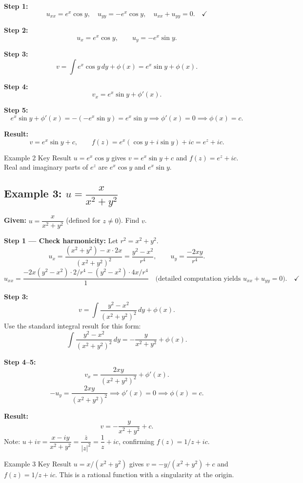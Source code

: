 \documentclass[12pt,a4paper]{article}
\begin{document}
\medskip
\textbf{Step 1:}
\[
  u_{xx}=e^x\cos y,\quad u_{yy}=-e^x\cos y,\quad u_{xx}+u_{yy}=0.\quad\checkmark
\]

\textbf{Step 2:}
\[
  u_x = e^x\cos y,\qquad u_y = -e^x\sin y.
\]

\textbf{Step 3:}
\[
  v = \int e^x\cos y\,dy + \phi(x) = e^x\sin y + \phi(x).
\]

\textbf{Step 4:}
\[
  v_x = e^x\sin y + \phi'(x).
\]

\textbf{Step 5:}
\[
  e^x\sin y+\phi'(x)= -(-e^x\sin y)=e^x\sin y \implies \phi'(x)=0 \implies \phi(x)=c.
\]

\textbf{Result:}
\[
  \boxed{v=e^x\sin y+c,\qquad f(z)=e^x(\cos y+i\sin y)+ic=e^z+ic.}
\]

\begin{learnbox}{Example 2 Key Result}
$u=e^x\cos y$ gives $v=e^x\sin y+c$ and $f(z)=e^z+ic$. Real and imaginary parts of
$e^z$ are $e^x\cos y$ and $e^x\sin y$.
\end{learnbox}

\subsection*{Example 3: $u = \dfrac{x}{x^2+y^2}$}

\textbf{Given:} $u=\dfrac{x}{x^2+y^2}$ (defined for $z\neq0$). Find $v$.

\medskip
\textbf{Step 1 --- Check harmonicity:} Let $r^2=x^2+y^2$.
\[
  u_x = \frac{(x^2+y^2)-x\cdot 2x}{(x^2+y^2)^2}=\frac{y^2-x^2}{r^4},\qquad
  u_y = \frac{-2xy}{r^4}.
\]
\[
  u_{xx}=\frac{-2x(y^2-x^2)\cdot2/r^4 - (y^2-x^2)\cdot 4x/r^4}{1}
  \quad\text{(detailed computation yields }u_{xx}+u_{yy}=0\text{).}\quad\checkmark
\]

\textbf{Step 3:}
\[
  v = \int \frac{y^2-x^2}{(x^2+y^2)^2}\,dy + \phi(x).
\]
Use the standard integral result for this form:
\[
  \int \frac{y^2-x^2}{(x^2+y^2)^2}\,dy = -\frac{y}{x^2+y^2}+\phi(x).
\]

\textbf{Step 4--5:}
\[
  v_x = \frac{2xy}{(x^2+y^2)^2}+\phi'(x).
\]
\[
  -u_y = \frac{2xy}{(x^2+y^2)^2} \implies \phi'(x)=0 \implies \phi(x)=c.
\]

\textbf{Result:}
\[
  \boxed{v=-\frac{y}{x^2+y^2}+c.}
\]
Note: $u+iv = \dfrac{x-iy}{x^2+y^2}=\dfrac{\overline{z}}{|z|^2}=\dfrac{1}{z}+ic$,
confirming $f(z)=1/z+ic$.

\begin{learnbox}{Example 3 Key Result}
$u=x/(x^2+y^2)$ gives $v=-y/(x^2+y^2)+c$ and $f(z)=1/z+ic$. This is a rational
function with a singularity at the origin.
\end{learnbox}
\end{document}

